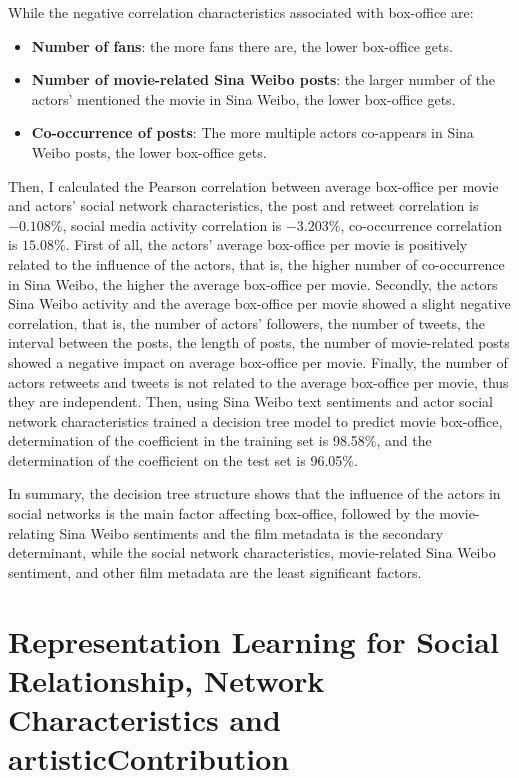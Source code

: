 \documentclass[review]{cvpr}
\begin{document}
While the negative correlation characteristics associated with box-office are:
\begin{itemize}
\item {\bf Number of fans}: the more fans there are, the lower box-office gets.
\item {\bf Number of movie-related Sina Weibo posts}: the larger number of the actors' mentioned the movie in Sina Weibo, the lower box-office gets.
\item {\bf Co-occurrence of posts}: The more multiple actors co-appears in Sina Weibo posts, the lower box-office gets.
\end{itemize}

\par Then, I calculated the Pearson correlation between average box-office per movie and actors' social network characteristics, the post and retweet correlation is $-0.108\%$, social media activity correlation is $-3.203\%$, co-occurrence correlation is $15.08\%$.
First of all, the actors' average box-office per movie is positively related to the influence of the actors, that is, the higher number of co-occurrence in Sina Weibo, the higher the average box-office per movie.
Secondly, the actors Sina Weibo activity and the average box-office per movie showed a slight negative correlation, that is,
the number of actors' followers, the number of tweets, the interval between the posts, the length of posts, the number of movie-related posts showed a negative impact on average box-office per movie.
Finally, the number of actors retweets and tweets is not related to the average box-office per movie, thus they are independent.
Then, using Sina Weibo text sentiments and actor social network characteristics trained a decision tree model to predict movie box-office,
determination of the coefficient in the training set is 98.58\%, and the determination of the coefficient on the test set is 96.05\%.

\par In summary, the decision tree structure shows that the influence of the actors in social networks is the main factor affecting box-office,
followed by the movie-relating Sina Weibo sentiments and the film metadata is the secondary determinant,
while the social network characteristics, movie-related Sina Weibo sentiment, and other film metadata are the least significant factors.

\section{Representation Learning for Social Relationship, Network Characteristics and artisticContribution}
\end{document}
